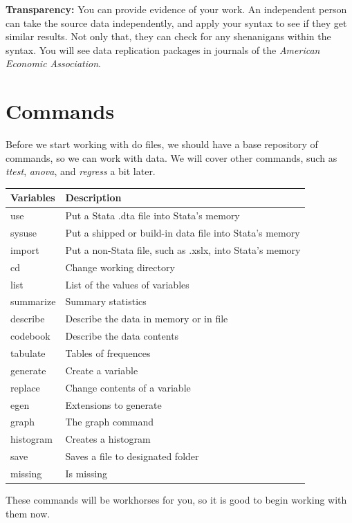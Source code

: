 \documentclass[
]{book}
\begin{document}
\textbf{Transparency:} You can provide evidence of your work. An independent person can take the source data independently, and apply your syntax to see if they get similar results. Not only that, they can check for any shenanigans within the syntax. You will see data replication packages in journals of the \emph{American Economic Association}.

\section{Commands}\label{commands}

Before we start working with do files, we should have a base repository of commands, so we can work with data. We will cover other commands, such as \emph{ttest}, \emph{anova}, and \emph{regress} a bit later.

\begin{tabular}{l|l}
\hline
Variables & Description\\
\hline
use & Put a Stata .dta file into Stata's memory\\
\hline
sysuse & Put a shipped or build-in data file into Stata's memory\\
\hline
import & Put a non-Stata file, such as .xslx, into Stata's memory\\
\hline
cd & Change working directory\\
\hline
list & List of the values of variables\\
\hline
summarize & Summary statistics\\
\hline
describe & Describe the data in memory or in file\\
\hline
codebook & Describe the data contents\\
\hline
tabulate & Tables of frequences\\
\hline
generate & Create a variable\\
\hline
replace & Change contents of a variable\\
\hline
egen & Extensions to generate\\
\hline
graph & The graph command\\
\hline
histogram & Creates a histogram\\
\hline
save & Saves a file to designated folder\\
\hline
missing & Is missing\\
\hline
\end{tabular}

These commands will be workhorses for you, so it is good to begin working with them now.
\end{document}
